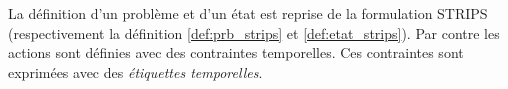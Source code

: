 La définition d'un problème et d'un état est reprise de la formulation STRIPS (respectivement la définition \ref{def:prb_strips} et \ref{def:etat_strips}).
Par contre les actions sont définies avec des contraintes temporelles.
Ces contraintes sont exprimées avec des \emph{étiquettes temporelles}.

%
%		
%

